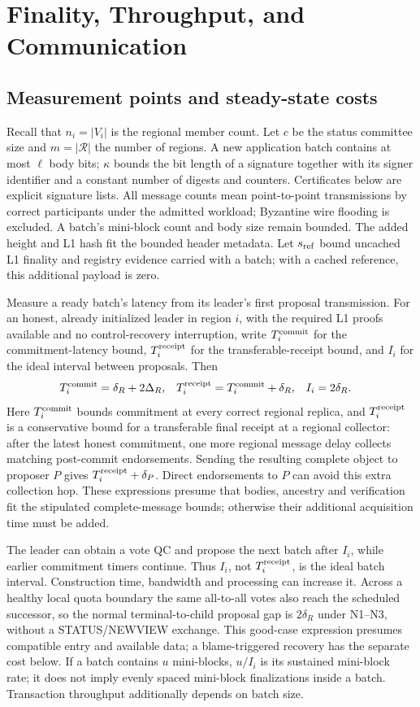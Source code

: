 \documentclass[11pt,a4paper,onecolumn]{article}
\begin{document}
\section{Finality, Throughput, and Communication}\label{sec:complexity}
\subsection{Measurement points and steady-state costs}
Recall that $n_i=|V_i|$ is the regional member count. Let $c$ be the status
committee size and $m=|\mathcal R|$ the number of regions.
A new application batch contains at most $\ell$ body bits;
$\kappa$ bounds the bit length of a signature together with its signer
identifier and a constant number of digests and counters. Certificates below are explicit
signature lists. All message counts mean point-to-point transmissions by
correct participants under the admitted workload; Byzantine wire flooding
is excluded. A batch's mini-block count and body size remain bounded.
The added height and L1 hash fit the bounded header metadata. Let
$s_{\rm ref}$ bound uncached L1 finality and registry evidence carried with
a batch; with a cached reference, this additional payload is zero.

Measure a ready batch's latency from its leader's first proposal transmission.
For an honest, already initialized leader in region $i$, with the required
L1 proofs available and no control-recovery interruption, write
$T_i^{\rm commit}$ for the commitment-latency bound,
$T_i^{\rm receipt}$ for the transferable-receipt bound, and $I_i$ for
the ideal interval between proposals. Then
\[
 \begin{aligned}
 T_i^{\rm commit}&=\delta_R+2\Delta_R,&
 T_i^{\rm receipt}&=T_i^{\rm commit}+\delta_R,&
 I_i&=2\delta_R.
 \end{aligned}
\]
Here $T_i^{\rm commit}$ bounds commitment at every correct regional replica, and $T_i^{\rm receipt}$
is a conservative bound for a transferable final receipt at a regional
collector: after the latest honest commitment, one more regional message
delay collects matching post-commit endorsements. Sending the resulting
complete object to proposer $P$ gives $T_i^{\rm receipt}+\delta_P$. Direct endorsements
to $P$ can avoid this extra collection hop. These expressions presume
that bodies, ancestry and verification fit the stipulated complete-message
bounds; otherwise their additional acquisition time must be added.

The leader can obtain a vote QC and propose the next batch after $I_i$,
while earlier commitment timers continue. Thus $I_i$, not $T_i^{\rm receipt}$, is the
ideal batch interval. Construction time, bandwidth and processing can
increase it. Across a healthy local quota boundary the same
all-to-all votes also reach the scheduled successor, so the normal
terminal-to-child proposal gap is $2\delta_R$ under N1--N3, without a
STATUS/NEWVIEW exchange. This good-case expression presumes compatible
entry and available data; a blame-triggered recovery has the separate cost
below. If a batch contains $u$ mini-blocks, $u/I_i$ is its sustained
mini-block rate; it does not imply evenly spaced mini-block finalizations
inside a batch. Transaction throughput additionally depends on batch size.
\end{document}
